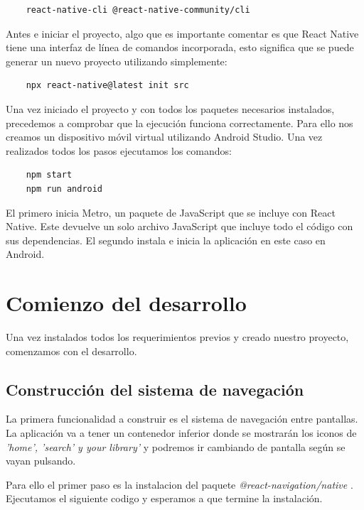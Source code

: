 \documentclass[a4paper, 11pt]{article}
\begin{document}
\begin{lstlisting}
    react-native-cli @react-native-community/cli
\end{lstlisting}

Antes e iniciar el proyecto, algo que es importante comentar es que React Native tiene una interfaz de línea de comandos
incorporada, esto significa que se puede generar un nuevo proyecto utilizando simplemente:

\begin{lstlisting}
    npx react-native@latest init src
\end{lstlisting}

Una vez iniciado el proyecto y con todos los paquetes necesarios instalados, precedemos a comprobar que la ejecución
funciona correctamente. Para ello nos creamos un dispositivo móvil virtual utilizando Android Studio. Una vez realizados
todos los pasos ejecutamos los comandos:

\begin{lstlisting}
    npm start
    npm run android
\end{lstlisting}

El primero inicia Metro, un paquete de JavaScript que se incluye con React Native. Este devuelve un solo archivo
JavaScript que incluye todo el código con sus dependencias. El segundo instala e inicia la aplicación en este caso en
Android.

\pagebreak
\section{Comienzo del desarrollo}

Una vez instalados todos los requerimientos previos y creado nuestro proyecto, comenzamos con el desarrollo.

\subsection{Construcción del sistema de navegación}

La primera funcionalidad a construir es el sistema de navegación entre pantallas. La aplicación va a tener un contenedor
inferior donde se mostrarán los iconos de \emph{'home', 'search' y your library'} y podremos ir cambiando de pantalla
según se vayan pulsando.

Para ello el primer paso es la instalacion del paquete \emph{@react-navigation/native} \cite{react-navigation}. Ejecutamos
el siguiente codigo y esperamos a que termine la instalación.
\end{document}
